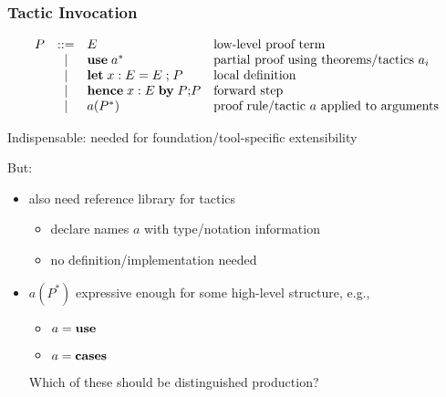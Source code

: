 \documentclass{beamer}
\renewcommand{\emph}[1]{\alert{#1}}
\begin{document}
\begin{frame}\frametitle{Tactic Invocation}
\[
\begin{array}{lcll}
P       &::=& E & \text{low-level proof term}\\
        &|&   \mathbf{use}\; a^* & \text{partial proof using theorems/tactics $a_i$}\\
        &|&   \mathbf{let}\; x:E=E\; \mathbf{;}\; P & \text{local definition}\\
        &|&   \mathbf{hence}\;x:E\; \mathbf{by}\; P\mathbf{;} P & \text{forward step} \\
        &|&   a(P^*) & \text{proof rule/tactic $a$ applied to arguments}
\end{array}
\]

Indispensable: needed for foundation/tool-specific extensibility

But:
\begin{itemize}
\item also need reference library for \emph{tactics}
 \begin{itemize}
  \item declare names $a$ with type/notation information
  \item no definition/implementation needed
 \end{itemize}
\item $a(P^*)$ expressive enough for some high-level structure, e.g.,
 \begin{itemize}
  \item $a=\mathbf{use}$
  \item $a=\mathbf{cases}$ 
 \end{itemize}
 Which of these should be distinguished production?
\end{itemize}
\end{frame}
\end{document}

